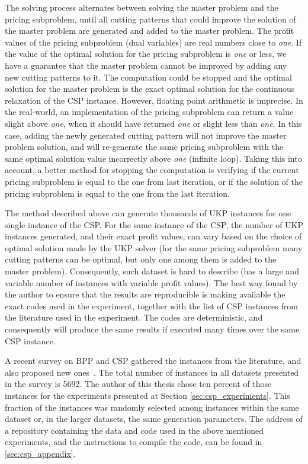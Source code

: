 The solving process alternates between solving the master problem and the pricing subproblem, until all cutting patterns that could improve the solution of the master problem are generated and added to the master problem.
The profit values of the pricing subproblem (dual variables) are real numbers close to \emph{one}.
If the value of the optimal solution for the pricing subproblem is \emph{one} or less, we have a guarantee that the master problem cannot be improved by adding any new cutting patterns to it.
The computation could be stopped and the optimal solution for the master problem is the exact optimal solution for the continuous relaxation of the CSP instance.
However, floating point arithmetic is imprecise.
In the real-world, an implementation of the pricing subproblem can return a value slight above \emph{one}, when it should have returned \emph{one} or slight less than \emph{one}.
In this case, adding the newly generated cutting pattern will not improve the master problem solution, and will re-generate the same pricing subproblem with the same optimal solution value incorrectly above \emph{one} (infinite loop).
Taking this into account, a better method for stopping the computation is verifying if the current pricing subproblem is equal to the one from last iteration, or if the solution of the pricing subproblem is equal to the one from the last iteration.


The method described above can generate thousands of UKP instances for one single instance of the CSP.
For the same instance of the CSP, the number of UKP instances generated, and their exact profit values, can vary based on the choice of optimal solution made by the UKP solver (for the same pricing subproblem many cutting patterns can be optimal, but only one among them is added to the master problem).
Consequently, such dataset is hard to describe (has a large and variable number of instances with variable profit values).
The best way found by the author to ensure that the results are reproducible is making available the exact codes used in the experiment, together with the list of CSP instances from the literature used in the experiment.
The codes are deterministic, and consequently will produce the same results if executed many times over the same CSP instance.

A recent survey on BPP and CSP gathered the instances from the literature, and also proposed new ones~\cite{survey2014}.
The total number of instances in all datasets presented in the survey is 5692.
The author of this thesis chose ten percent of those instances for the experiments presented at Section \ref{sec:csp_experiments}.
This fraction of the instances was randomly selected among instances within the same dataset or, in the larger datasets, the same generation parameters.
The address of a repository containing the data and code used in the above mentioned experiments, and the instructions to compile the code, can be found in \ref{sec:csp_appendix}.

